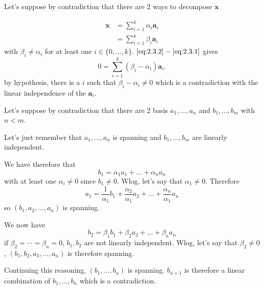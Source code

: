 \begin{solution}
  Let's suppose by contradiction that there are 2 ways
  to decompose $\mathbf{x}$

  \begin{align}
    \label{eq:2.3.1}
    \mathbf{x} & = \sum_{i=1}^k \alpha_i \mathbf{a}_i\\
    \label{eq:2.3.2}
               & = \sum_{i=1}^k \beta_i \mathbf{a}_i
  \end{align}
  with $\beta_i \neq \alpha_i$ for at least one $i \in \{0, \ldots, k\}$.
  $\eqref{eq:2.3.2}-\eqref{eq:2.3.1}$ gives
  \[
    0 = \sum_{i=1}^k (\beta_i-\alpha_i) \mathbf{a}_i.
  \]
  by hypothesis, there is a $i$ such that $\beta_i-\alpha_i \neq 0$
  which is a contradiction with the linear independence of the $\mathbf{a}_i$.
\end{solution}

\begin{solution}
  Let's suppose by contradiction that there are 2
  basis $a_1, \ldots, a_n$ and $b_1, \ldots, b_m$ with $n < m$.

  Let's just remember that $a_1, \ldots, a_n$ is spanning
  and $b_1, \ldots, b_m$ are linearly independent.

  We have therefore that
  \[ b_1 = \alpha_1 a_1 + \ldots + \alpha_n a_n\]
  with at least one $\alpha_i \neq 0$ since $b_1 \neq 0$.
  Wlog, let's say that $\alpha_1 \neq 0$.
  Therefore
  \[ a_1 = \frac{1}{\alpha_1}b_1 + \frac{\alpha_2}{\alpha_1} a_2 + \ldots + \frac{\alpha_n}{\alpha_1} a_n\]
  so $(b_1, a_2, \ldots, a_n)$ is spanning.

  We now have
  \[ b_2 = \beta_1 b_1 + \beta_2 a_2 + \ldots + \beta_n a_n\]
  if $\beta_2 = \cdots = \beta_n = 0$, $b_1, b_2$ are not linearly independent.
  Wlog, let's say that $\beta_2 \neq 0$,
  $(b_1,b_2,a_3,\ldots,a_n)$ is therefore spanning.

  Continuing this reasoning, $(b_1,\ldots,b_n)$ is spanning.
  $b_{n+1}$ is therefore a linear combination of $b_1, \ldots, b_n$ which is a contradiction.
\end{solution}

